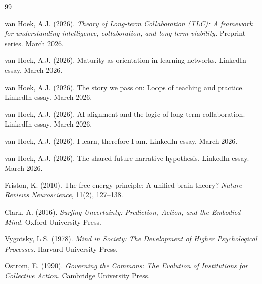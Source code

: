 \documentclass[11pt]{article}
\begin{document}
\begin{thebibliography}{99}

van Hoek, A.J. (2026).
\textit{Theory of Long-term Collaboration (TLC): A framework for understanding
intelligence, collaboration, and long-term viability.}
Preprint series. March 2026.

van Hoek, A.J. (2026).
Maturity as orientation in learning networks.
LinkedIn essay. March 2026.

van Hoek, A.J. (2026).
The story we pass on: Loops of teaching and practice.
LinkedIn essay. March 2026.

van Hoek, A.J. (2026).
AI alignment and the logic of long-term collaboration.
LinkedIn essay. March 2026.

van Hoek, A.J. (2026).
I learn, therefore I am.
LinkedIn essay. March 2026.

van Hoek, A.J. (2026).
The shared future narrative hypothesis.
LinkedIn essay. March 2026.

Friston, K. (2010).
The free-energy principle: A unified brain theory?
\textit{Nature Reviews Neuroscience}, 11(2), 127--138.

Clark, A. (2016).
\textit{Surfing Uncertainty: Prediction, Action, and the Embodied Mind.}
Oxford University Press.

Vygotsky, L.S. (1978).
\textit{Mind in Society: The Development of Higher Psychological Processes.}
Harvard University Press.

Ostrom, E. (1990).
\textit{Governing the Commons: The Evolution of Institutions for Collective Action.}
Cambridge University Press.

\end{thebibliography}
\end{document}
